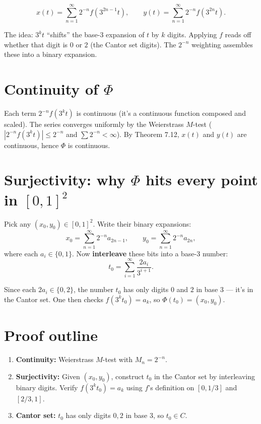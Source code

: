 \documentclass[12pt]{article}
\begin{document}
$$
x(t) = \sum_{n=1}^{\infty} 2^{-n} f(3^{2n-1} t), \qquad y(t) = \sum_{n=1}^{\infty} 2^{-n} f(3^{2n} t).
$$

The idea: $3^k t$ ``shifts'' the base-3 expansion of $t$ by $k$ digits. Applying $f$ reads off whether that digit is $0$ or $2$ (the Cantor set digits). The $2^{-n}$ weighting assembles these into a binary expansion.

\section*{Continuity of $\Phi$}

Each term $2^{-n} f(3^k t)$ is continuous (it's a continuous function composed and scaled). The series converges uniformly by the Weierstrass $M$-test ($|2^{-n} f(3^k t)| \leq 2^{-n}$ and $\sum 2^{-n} < \infty$). By Theorem 7.12, $x(t)$ and $y(t)$ are continuous, hence $\Phi$ is continuous.

\section*{Surjectivity: why $\Phi$ hits every point in $[0,1]^2$}

Pick any $(x_0, y_0) \in [0,1]^2$. Write their binary expansions:
$$
x_0 = \sum_{n=1}^{\infty} 2^{-n} a_{2n-1}, \qquad y_0 = \sum_{n=1}^{\infty} 2^{-n} a_{2n},
$$
where each $a_i \in \{0, 1\}$. Now \textbf{interleave} these bits into a base-3 number:
$$
t_0 = \sum_{i=1}^{\infty} \frac{2a_i}{3^{i+1}}.
$$

\begin{center}
\end{center}

Since each $2a_i \in \{0, 2\}$, the number $t_0$ has only digits $0$ and $2$ in base 3 --- it's in the Cantor set. One then checks $f(3^k t_0) = a_k$, so $\Phi(t_0) = (x_0, y_0)$.

\section*{Proof outline}
\begin{enumerate}
    \item \textbf{Continuity:} Weierstrass $M$-test with $M_n = 2^{-n}$.
    \item \textbf{Surjectivity:} Given $(x_0, y_0)$, construct $t_0$ in the Cantor set by interleaving binary digits. Verify $f(3^k t_0) = a_k$ using $f$'s definition on $[0,1/3]$ and $[2/3, 1]$.
    \item \textbf{Cantor set:} $t_0$ has only digits $0, 2$ in base 3, so $t_0 \in C$.
\end{enumerate}
\end{document}
